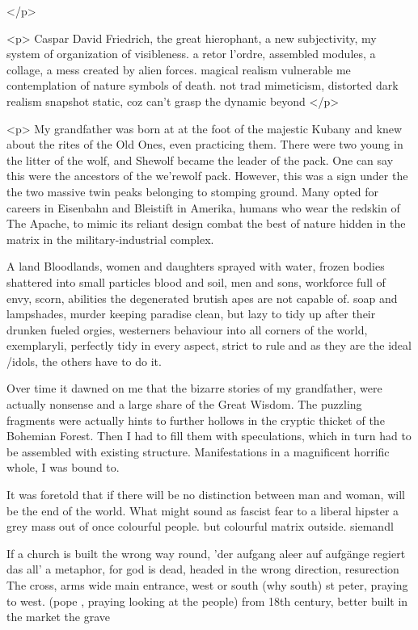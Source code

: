 \documentclass{article}
\begin{document}
</p>




<p>
Caspar David Friedrich, the great hierophant, 
a new subjectivity, my system of organization of visibleness.
a retor l'ordre, 
assembled modules, a collage, a mess created by alien forces.
magical realism
vulnerable
me contemplation of nature
symbols of death.
not trad mimeticism, distorted dark realism
snapshot static, coz 
can't grasp the dynamic beyond 
</p>


<p>
My grandfather was born at at the foot of the majestic Kubany and knew about the 
rites of the Old Ones, even practicing them.  
There were two young in the litter of the wolf, 
and Shewolf became the leader of the  pack.  
One can say this were the ancestors of the we'rewolf pack.  
However, this was  a sign under the the two massive twin peaks belonging to stomping ground.  
Many opted for careers in Eisenbahn and Bleistift in Amerika, 
humans who wear the redskin of The Apache, 
to mimic its reliant design combat
the best of nature hidden in the matrix in the military-industrial complex. 

A land Bloodlands, women and daughters
sprayed with water, frozen bodies shattered into small 
particles 
blood and soil, 
men and sons, workforce
full of envy, scorn, abilities the degenerated brutish apes are not capable of. 
soap and lampshades, 
murder keeping paradise clean, 
but lazy to tidy up after their 
drunken fueled orgies, westerners behaviour into all corners of the world, exemplaryli, perfectly tidy in every aspect, strict to rule and as they are the ideal /idols, 
the others have to do it. 


Over time it dawned on me that the bizarre stories of my grandfather, 
were actually nonsense and a large share of the Great Wisdom.
The puzzling fragments were actually hints to further hollows
in the cryptic thicket of the Bohemian Forest.
Then I had to fill them with speculations, which in turn 
had to be assembled with existing structure. 
Manifestations in a magnificent horrific whole, I was bound to.

It was foretold that if there will 
be no distinction between man and woman, 
will be the end of the world. 
What might sound as fascist fear to a liberal hipster
a grey mass out of once colourful people. 
but colourful matrix outside. 
siemandl


If a church is built the wrong way round, 
'der aufgang aleer auf aufgänge regiert das all' 
a metaphor, for god is dead, headed in the wrong direction,
resurection The cross, arms wide main entrance, west or south (why south) 
st peter, praying to west. 
(pope , praying looking at the people) from 18th century, better built in the market 
the grave 
\end{document}
